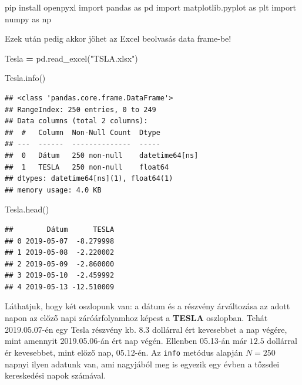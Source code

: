 \documentclass[
]{book}
\newenvironment{Shaded}{\begin{snugshade}}{\end{snugshade}}
\newcommand{\ImportTok}[1]{#1}
\newcommand{\NormalTok}[1]{#1}
\newcommand{\OperatorTok}[1]{\textcolor[rgb]{0.81,0.36,0.00}{\textbf{#1}}}
\newcommand{\StringTok}[1]{\textcolor[rgb]{0.31,0.60,0.02}{#1}}
\begin{document}
\begin{Shaded}
\begin{Highlighting}[]
\NormalTok{pip install openpyxl}
\ImportTok{import}\NormalTok{ pandas }\ImportTok{as}\NormalTok{ pd}
\ImportTok{import}\NormalTok{ matplotlib.pyplot }\ImportTok{as}\NormalTok{ plt}
\ImportTok{import}\NormalTok{ numpy }\ImportTok{as}\NormalTok{ np}
\end{Highlighting}
\end{Shaded}

Ezek után pedig akkor jöhet az Excel beolvasás data frame-be!

\begin{Shaded}
\begin{Highlighting}[]
\NormalTok{Tesla }\OperatorTok{=}\NormalTok{ pd.read\_excel(}\StringTok{"TSLA.xlsx"}\NormalTok{)}

\NormalTok{Tesla.info()}
\end{Highlighting}
\end{Shaded}

\begin{verbatim}
## <class 'pandas.core.frame.DataFrame'>
## RangeIndex: 250 entries, 0 to 249
## Data columns (total 2 columns):
##  #   Column  Non-Null Count  Dtype         
## ---  ------  --------------  -----         
##  0   Dátum   250 non-null    datetime64[ns]
##  1   TESLA   250 non-null    float64       
## dtypes: datetime64[ns](1), float64(1)
## memory usage: 4.0 KB
\end{verbatim}

\begin{Shaded}
\begin{Highlighting}[]
\NormalTok{Tesla.head()}
\end{Highlighting}
\end{Shaded}

\begin{verbatim}
##        Dátum      TESLA
## 0 2019-05-07  -8.279998
## 1 2019-05-08  -2.220002
## 2 2019-05-09  -2.860000
## 3 2019-05-10  -2.459992
## 4 2019-05-13 -12.510009
\end{verbatim}

Láthatjuk, hogy két oszlopunk van: a dátum és a részvény árváltozása az adott napon az előző napi záróárfolyamhoz képest a \textbf{TESLA} oszlopban. Tehát 2019.05.07-én egy Tesla részvény kb. \(8.3\) dollárral ért kevesebbet a nap végére, mint amennyit 2019.05.06-án ért nap végén. Ellenben 05.13-án már \(12.5\) dollárral ér kevesebbet, mint előző nap, 05.12-én. Az \texttt{info} metódus alapján \(N=250\) napnyi ilyen adatunk van, ami nagyjából meg is egyezik egy évben a tőzsdei kereskedési napok számával.
\end{document}
